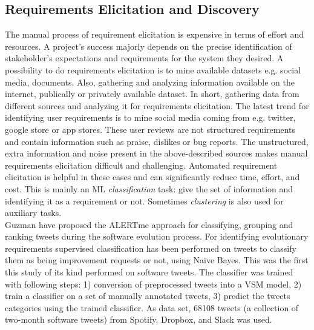 
\subsection{Requirements Elicitation and Discovery}

The manual process of requirement elicitation is expensive in terms of
effort and resources. A project's success majorly depends
on the precise identification of stakeholder's expectations and requirements for
the system they desired.
A possibility to do requirements elicitation is to mine available datasets e.g.
social media, documents. Also, gathering and analyzing
information available on the internet, publically or privately available
dataset. In short, gathering data from different
sources and analyzing it for requirements elicitation. The latest trend for
identifying user requirements is to mine social media coming from e.g. twitter,
google store or app stores. These user reviews are not structured requirements
and contain information such as praise, dislikes or bug reports. The
unstructured, extra information and noise present in the above-described
sources makes manual requirements elicitation difficult and challenging.
Automated requirement elicitation is helpful in these cases and can
significantly reduce time, effort, and cost. This is mainly an ML
\emph{classification} task: give the set of information and identifying it as a
requirement or not. Sometimes \emph{clustering} is also used for auxiliary
tasks.\\

Guzman \etal \cite{Guzman:2017} have proposed the ALERTme approach for
classifying, grouping and ranking tweets during the software
evolution process. For identifying evolutionary
requirements supervised
classification has been performed on tweets to classify them as being
improvement requests or not, using Naïve Bayes. This was the first this study of
its kind performed on software tweets. 
The classifier was trained with following steps: 1) conversion of
preprocessed tweets into a VSM model, 2) train a classifier
on a set of manually annotated tweets, 3) predict the tweets categories using the trained classifier.
As data set, 68108 tweets (a collection of two-month software tweets) from
Spotify, Dropbox, and Slack was used.

